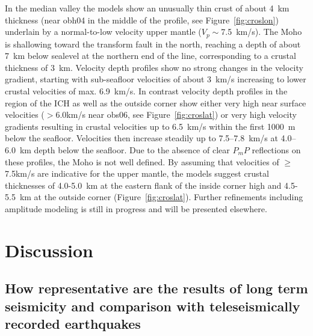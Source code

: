 \documentclass[jgr]{agu2001}
\begin{document}
\begin{article}
 In the median valley the models show an unusually thin crust
of about 4~km thickness (near obh04 in the middle of the profile, see Figure~\ref{fig:croslon})
underlain by a normal-to-low
velocity upper mantle ($V_p\sim$7.5~km/s).  The Moho is shallowing
toward the transform fault in the north, reaching a depth of about
7~km below sealevel at the northern end of the line, corresponding to a
crustal thickness of 3~km. Velocity depth profiles show no strong changes in the velocity
gradient, starting with  sub-seafloor velocities of about 3~km/s
increasing to lower crustal velocities of max. 6.9~km/s.
 In contrast
velocity depth profiles in the region of the ICH as
well as the outside corner show either very high near surface
velocities ($>$6.0km/s near obs06, see Figure~\ref{fig:croslat}) or very high velocity
gradients resulting in  crustal velocities up to 6.5~km/s within the
first 1000~m below the seafloor. Velocities then  increase steadily up to
 7.5--7.8~km/s at 4.0--6.0~km depth below the seafloor. Due to the
absence of clear $P_mP$ reflections on these profiles, the Moho is not well defined. By
assuming that velocities of $\geq$7.5km/s are indicative for the upper
mantle, the models suggest crustal thicknesses of 4.0-5.0~km at the
eastern flank of the inside corner high and 4.5-5.5~km at the outside
corner (Figure~\ref{fig:croslat}). Further refinements including amplitude modeling is still in
progress and will be presented elsewhere.

\section{Discussion}

\subsection{How representative are the results of long term
  seismicity and comparison with teleseismically recorded earthquakes}


\end{article}
\end{document}
